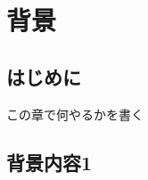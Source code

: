 \documentclass[../thesis]{subfiles}
\begin{document}
\chapter{背景}
\section{はじめに}
この章で何やるかを書く
\section{背景内容1}
\end{document}
